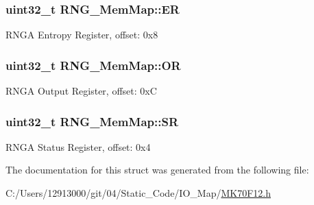 \subsubsection[{E\+R}]{\setlength{\rightskip}{0pt plus 5cm}uint32\+\_\+t R\+N\+G\+\_\+\+Mem\+Map\+::\+E\+R}\label{struct_r_n_g___mem_map_a00c023d8dafb81ac55c86b3ad8decb3d}
R\+N\+G\+A Entropy Register, offset\+: 0x8 \hypertarget{struct_r_n_g___mem_map_a28a39f4167d28546cea918687d2951f1}{}
\subsubsection[{O\+R}]{\setlength{\rightskip}{0pt plus 5cm}uint32\+\_\+t R\+N\+G\+\_\+\+Mem\+Map\+::\+O\+R}\label{struct_r_n_g___mem_map_a28a39f4167d28546cea918687d2951f1}
R\+N\+G\+A Output Register, offset\+: 0x\+C \hypertarget{struct_r_n_g___mem_map_a5d258b2ed1915070a6d3651092d8f3c7}{}
\subsubsection[{S\+R}]{\setlength{\rightskip}{0pt plus 5cm}uint32\+\_\+t R\+N\+G\+\_\+\+Mem\+Map\+::\+S\+R}\label{struct_r_n_g___mem_map_a5d258b2ed1915070a6d3651092d8f3c7}
R\+N\+G\+A Status Register, offset\+: 0x4 

The documentation for this struct was generated from the following file\+:\begin{DoxyCompactItemize}
\item 
C\+:/\+Users/12913000/git/04/\+Static\+\_\+\+Code/\+I\+O\+\_\+\+Map/\hyperlink{_m_k70_f12_8h}{M\+K70\+F12.\+h}\end{DoxyCompactItemize}
